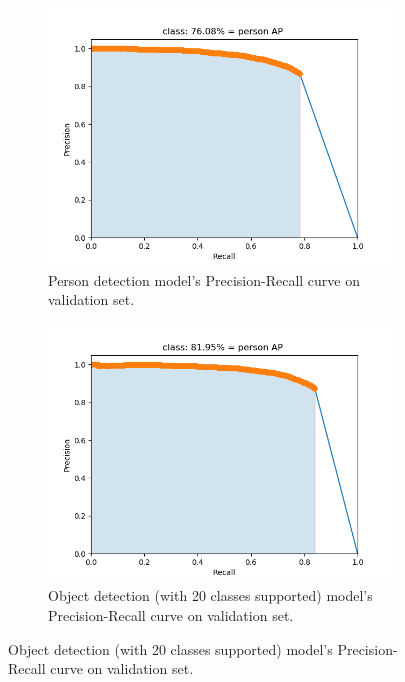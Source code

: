 \begin{figure}
    \begin{subfigure}
        \centering
        \includegraphics[scale=0.8]{figures/eval_detector_pr_curve.png}
        \caption{Person detection model's Precision-Recall curve on validation
            set.}
        \label{fig:eval-detector-pr}
    \end{subfigure}
    \begin{subfigure}
        \centering
        \includegraphics[scale=0.8]{figures/eval_detector_pr_curve1.png}
        \caption{Object detection (with 20 classes supported) model's
            Precision-Recall curve on validation set.}
        \label{fig:eval-detector-pr1}
    \end{subfigure}
\end{figure}

